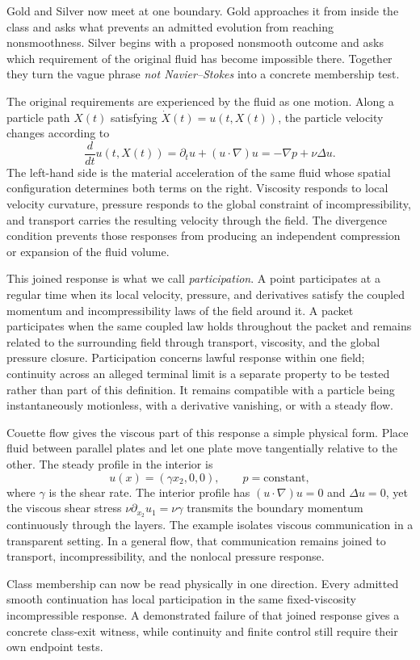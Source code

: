 Gold and Silver now meet at one boundary.
Gold approaches it from inside the class and asks what prevents an admitted evolution from reaching nonsmoothness.
Silver begins with a proposed nonsmooth outcome and asks which requirement of the original fluid has become impossible there.
Together they turn the vague phrase \emph{not Navier--Stokes} into a concrete membership test.

\newpage
{}

The original requirements are experienced by the fluid as one motion.
Along a particle path \(X(t)\) satisfying \(\dot X(t)=u(t,X(t))\), the particle velocity changes according to
\[
  \frac{d}{dt}u(t,X(t))
  =
  \partial_tu+(u\cdot\nabla)u
  =
  -\nabla p+\nu\Delta u.
\]
The left-hand side is the material acceleration of the same fluid whose spatial configuration determines both terms on the right.
Viscosity responds to local velocity curvature, pressure responds to the global constraint of incompressibility, and transport carries the resulting velocity through the field.
The divergence condition prevents those responses from producing an independent compression or expansion of the fluid volume.

This joined response is what we call \emph{participation}.
A point participates at a regular time when its local velocity, pressure, and derivatives satisfy the coupled momentum and incompressibility laws of the field around it.
A packet participates when the same coupled law holds throughout the packet and remains related to the surrounding field through transport, viscosity, and the global pressure closure.
Participation concerns lawful response within one field; continuity across an alleged terminal limit is a separate property to be tested rather than part of this definition.
It remains compatible with a particle being instantaneously motionless, with a derivative vanishing, or with a steady flow.

Couette flow gives the viscous part of this response a simple physical form.
Place fluid between parallel plates and let one plate move tangentially relative to the other.
The steady profile in the interior is
\[
  u(x)=(\gamma x_2,0,0),
  \qquad
  p=\text{constant},
\]
where \(\gamma\) is the shear rate.
The interior profile has \((u\cdot\nabla)u=0\) and \(\Delta u=0\), yet the viscous shear stress \(\nu\partial_{x_2}u_1=\nu\gamma\) transmits the boundary momentum continuously through the layers.
The example isolates viscous communication in a transparent setting.
In a general flow, that communication remains joined to transport, incompressibility, and the nonlocal pressure response.

Class membership can now be read physically in one direction.
Every admitted smooth continuation has local participation in the same fixed-viscosity incompressible response.
A demonstrated failure of that joined response gives a concrete class-exit witness, while continuity and finite control still require their own endpoint tests.

